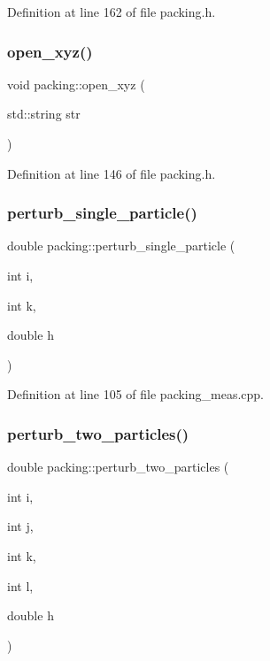 Definition at line 162 of file packing.\+h.

\mbox{\label{classpacking_a0c837c1a1a49e78d98e3caa99452ba48}} 
\subsubsection{\texorpdfstring{open\+\_\+xyz()}{open\_xyz()}}
{\footnotesize\ttfamily void packing\+::open\+\_\+xyz (\begin{DoxyParamCaption}\item[{std\+::string}]{str }\end{DoxyParamCaption})\hspace{0.3cm}{\ttfamily [inline]}}



Definition at line 146 of file packing.\+h.

\mbox{\label{classpacking_a9e94b699c2cc7d52a74cd2e4a8642371}} 
\subsubsection{\texorpdfstring{perturb\+\_\+single\+\_\+particle()}{perturb\_single\_particle()}}
{\footnotesize\ttfamily double packing\+::perturb\+\_\+single\+\_\+particle (\begin{DoxyParamCaption}\item[{int}]{i,  }\item[{int}]{k,  }\item[{double}]{h }\end{DoxyParamCaption})}



Definition at line 105 of file packing\+\_\+meas.\+cpp.

\mbox{\label{classpacking_aa9d162db11496df9f1dd4696fe1924da}} 
\subsubsection{\texorpdfstring{perturb\+\_\+two\+\_\+particles()}{perturb\_two\_particles()}}
{\footnotesize\ttfamily double packing\+::perturb\+\_\+two\+\_\+particles (\begin{DoxyParamCaption}\item[{int}]{i,  }\item[{int}]{j,  }\item[{int}]{k,  }\item[{int}]{l,  }\item[{double}]{h }\end{DoxyParamCaption})}



